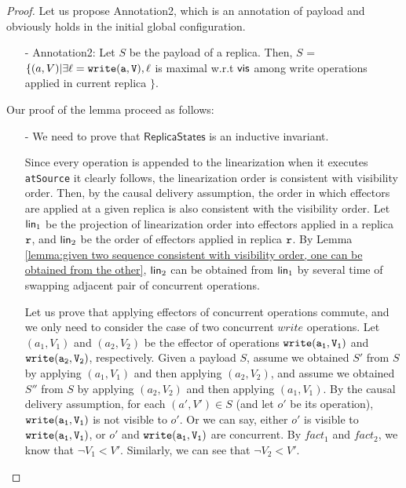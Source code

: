 \begin {proof}
Let us propose Annotation2, which is an annotation of payload and obviously holds in the initial global configuration.

\begin{itemize}
\setlength{\itemsep}{0.5pt}
\item[-] Annotation2: Let $S$ be the payload of a replica. Then, $S$ =  $\{ (a,V) \vert \exists \alabel = \alabelshort[{\tt write}]{a,V}, \alabel$ is maximal w.r.t $\mathsf{vis}$ among write operations applied in current replica $\}$.
\end{itemize}

Our proof of the lemma proceed as follows:

\begin{itemize}
\setlength{\itemsep}{0.5pt}
\item[-] We need to prove that $\mathsf{ReplicaStates}$ is an inductive invariant.

Since every operation is appended to the linearization when it executes \lstinline|atSource| it clearly follows, the linearization order is consistent with visibility order. Then, by the causal delivery assumption, the order in which effectors are applied at a given replica is also consistent with the visibility order. Let $\mathsf{lin}_1$ be the projection of linearization order into effectors applied in a replica $\mathtt{r}$, and $\mathsf{lin}_2$ be the order of effectors applied in replica $\mathtt{r}$. By Lemma \ref{lemma:given two sequence consistent with visibility order, one can be obtained from the other}, $\mathsf{lin}_2$ can be obtained from $\mathsf{lin}_1$ by several time of swapping adjacent pair of concurrent operations.

Let us prove that applying effectors of concurrent operations commute, and we only need to consider the case of two concurrent $write$ operations. Let $(a_1,V_1)$ and $(a_2,V_2)$ be the effector of operations $\alabelshort[{\tt write}]{a_1,V_1}$ and $\alabelshort[{\tt write}]{a_2,V_2}$, respectively. Given a payload $S$, assume we obtained $S'$ from $S$ by applying $(a_1,V_1)$ and then applying $(a_2,V_2)$, and assume we obtained $S''$ from $S$ by applying $(a_2,V_2)$ and then applying $(a_1,V_1)$. By the causal delivery assumption, for each $(a',V') \in S$ (and let $o'$ be its operation), $\alabelshort[{\tt write}]{a_1,V_1}$ is not visible to $o'$. Or we can say, either $o'$ is visible to $\alabelshort[{\tt write}]{a_1,V_1}$, or $o'$ and $\alabelshort[{\tt write}]{a_1,V_1}$ are concurrent. By $fact_1$ and $fact_2$, we know that $\neg V_1 < V'$. Similarly, we can see that $\neg V_2 < V'$.


\end{itemize}
\end{proof}
